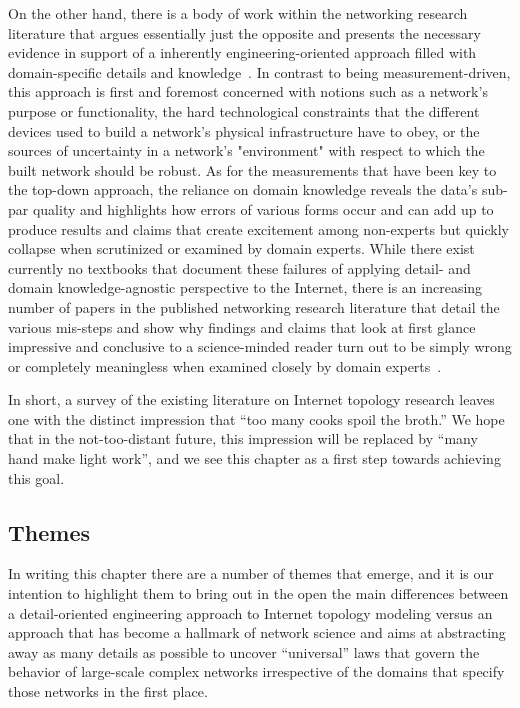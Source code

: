On the other hand, there is a body of work within the networking
research literature that argues essentially just the opposite and
presents the necessary evidence in support of a inherently
engineering-oriented approach filled with domain-specific details and
knowledge~\cite{Li04,Alderson05,willinger09:_mathem_and_inter}. In contrast to being
measurement-driven, this approach is first and foremost concerned with
notions such as a network's purpose or functionality, the hard
technological constraints that the different devices used to build a
network's physical infrastructure have to obey, or the sources of
uncertainty in a network's "environment" with respect to which the
built network should be robust.  As for the measurements that have
been key to the top-down approach, the reliance on domain knowledge
reveals the data's sub-par quality and highlights how errors of
various forms occur and can add up to produce results and claims that
create excitement among non-experts but quickly collapse when
scrutinized or examined by domain experts. While there exist currently
no textbooks that document these failures of applying detail- and
domain knowledge-agnostic perspective to the Internet, there is an
increasing number of papers in the published networking research
literature that detail the various mis-steps and show why findings and
claims that look at first glance impressive and conclusive to a
science-minded reader turn out to be simply wrong or completely
meaningless when examined closely by domain
experts~\cite{willinger09:_mathem_and_inter,Alderson10,krishnamurthy11:_what}.

In short, a survey of the existing literature on Internet topology
research leaves one with the distinct impression that ``too many cooks
spoil the broth.''  We hope that in the not-too-distant future, this
impression will be replaced by ``many hand make light work'', and we
see this chapter as a first step towards achieving this goal.

\subsection{Themes}

In writing this chapter there are a number of themes that emerge, and
it is our intention to highlight them to bring out in the open the
main differences between a detail-oriented engineering approach to
Internet topology modeling versus an approach that has become a
hallmark of network science and aims at abstracting away as many
details as possible to uncover ``universal'' laws that govern the
behavior of large-scale complex networks irrespective of the domains
that specify those networks in the first place.
 
